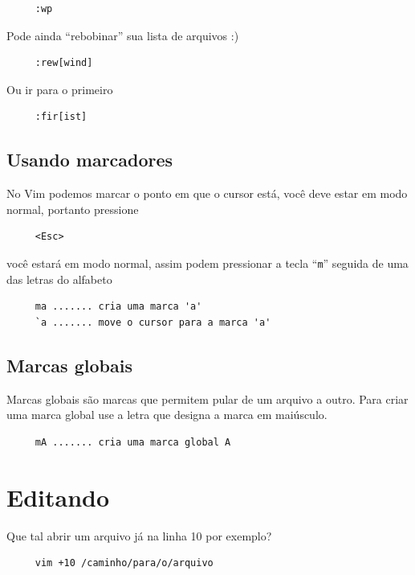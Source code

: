 \documentclass[10pt,a4paper,openany]{book}
\begin{document}
\begin{verbatim}
     :wp
\end{verbatim}

Pode ainda ``rebobinar'' sua lista de arquivos :)

\begin{verbatim}
     :rew[wind]
\end{verbatim}

Ou ir para o primeiro

\begin{verbatim}
     :fir[ist]
\end{verbatim}

\section{Usando marcadores}
\label{Usando marcadores}

No Vim podemos marcar o ponto em que o cursor está, você deve estar em
modo normal, portanto pressione

\begin{verbatim}
     <Esc>
\end{verbatim}

você estará em modo normal, assim podem pressionar a tecla ``\verb+m+''
seguida de uma das letras do alfabeto

\begin{verbatim}
     ma ....... cria uma marca 'a'
     `a ....... move o cursor para a marca 'a'
\end{verbatim}

\section{Marcas globais}
\label{Marcas globais}
Marcas globais são marcas que permitem pular de um arquivo a outro.
Para criar uma marca global use a letra que designa a marca em
maiúsculo.

\begin{verbatim}
     mA ....... cria uma marca global A
\end{verbatim}

\chapter{Editando}
\label{Editando}

Que tal abrir um arquivo já na linha 10 por exemplo?

\begin{verbatim}
     vim +10 /caminho/para/o/arquivo
\end{verbatim}
\end{document}
